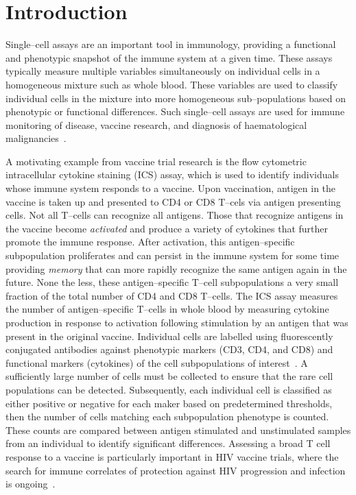 \documentclass[11pt]{article}
\begin{document}
\section{Introduction}
Single--cell assays are an important tool in immunology, providing a functional and phenotypic snapshot of the immune system at a given time. These assays typically measure multiple variables simultaneously on individual cells in a homogeneous mixture such as whole blood. These variables are used to classify individual cells in the mixture into more homogeneous sub--populations based on phenotypic or functional differences. Such single--cell assays are used for immune monitoring of disease, vaccine research, and diagnosis of haematological malignancies~\cite{Altman:1996wf,Betts:2006dw,Inokuma:2007tn}.

A motivating example from vaccine trial research is the flow cytometric intracellular cytokine staining (ICS) assay, which is used to identify individuals whose immune system responds to a vaccine. Upon vaccination, antigen in the vaccine is taken up and presented to CD4 or CD8 T--cels via antigen presenting cells. Not all T--cells can recognize all antigens. Those that recognize antigens in the vaccine become \emph{activated} and produce a variety of cytokines that further promote the immune response. After activation, this antigen--specific subpopulation proliferates and can persist in the immune system for some time providing \emph{memory} that can more rapidly recognize the same antigen again in the future. None the less, these antigen--specific T--cell subpopulations a very small fraction of the total number of CD4 and CD8 T--cells. The ICS assay measures the number of antigen--specific T--cells in whole blood by measuring cytokine production in response to activation following stimulation by an antigen that was present in the original vaccine. Individual cells are labelled using fluorescently conjugated antibodies against phenotypic markers (CD3, CD4, and CD8) and functional markers (cytokines) of the cell subpopulations of interest~\cite{Horton:2007tsa,DeRosa:2004wp,Betts:2006dw}. A sufficiently large number of cells must be collected to ensure that the rare cell populations can be detected. Subsequently, each individual cell is classified as either positive or negative for each maker based on predetermined thresholds, then the number of cells matching each subpopulation phenotype is counted. These counts are compared between antigen stimulated and unstimulated samples from an individual to identify significant differences. Assessing a broad T cell response to a vaccine is particularly important in HIV vaccine trials, where the search for immune correlates of protection against HIV progression and infection is ongoing~\cite{Plotkin:2010ve,Horton:2007tsa,Kim:2010fw}.
\end{document}
